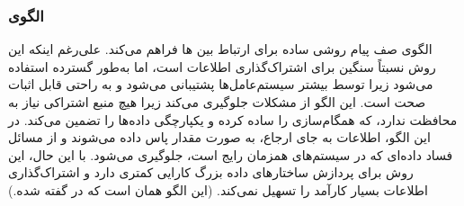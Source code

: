 \subsubsection{الگوی }
\label{archConMessageQueSec}
\begin{RTL}
الگوی صف پیام \cite{ref4} روشی ساده برای ارتباط بین  ها فراهم می‌کند.
علی‌رغم اینکه این روش نسبتاً سنگین برای اشتراک‌گذاری اطلاعات است، اما به‌طور گسترده
استفاده می‌شود زیرا توسط بیشتر سیستم‌عامل‌ها پشتیبانی می‌شود و به راحتی
قابل اثبات صحت است. این الگو از مشکلات 
جلوگیری می‌کند زیرا هیچ منبع اشتراکی نیاز به محافظت ندارد، که همگام‌سازی را ساده کرده
و یکپارچگی داده‌ها را تضمین می‌کند. در این الگو، اطلاعات به جای ارجاع،
به صورت مقدار پاس داده می‌شوند و از مسائل فساد داده‌ای
که در سیستم‌های همزمان رایج است، جلوگیری می‌شود. با این حال،
این روش برای پردازش ساختارهای داده بزرگ کارایی کمتری دارد
و اشتراک‌گذاری اطلاعات بسیار کارآمد را تسهیل نمی‌کند.
(این الگو همان  است که در
\cite{ref1} گفته شده.)
\end{RTL}